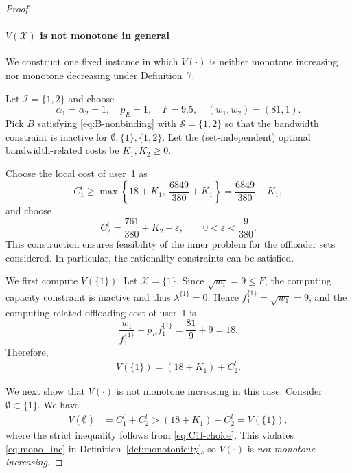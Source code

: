 \documentclass[lettersize,journal]{IEEEtran}
\begin{document}
\begin{proof}
\paragraph{$V(\mathcal{X})$ is not monotone in general}
We construct one fixed instance in which $V(\cdot)$ is neither monotone increasing nor monotone decreasing under Definition~7.

Let $\mathcal{I}=\{1,2\}$ and choose
\[
\alpha_1=\alpha_2=1,\quad p_E=1,\quad F=9.5,\quad (w_1,w_2)=(81,1).
\]
Pick $B$ satisfying \eqref{eq:B-nonbinding} with $\mathcal{S}=\{1,2\}$ so that the bandwidth constraint is inactive for $\emptyset,\{1\},\{1,2\}$.
Let the (set-independent) optimal bandwidth-related costs be $K_1,K_2\ge 0$.

Choose the local cost of user~1 as
\begin{equation}
C_1^l \ge \max\left\{18+K_1,\ \frac{6849}{380}+K_1\right\}
=\frac{6849}{380}+K_1,
\label{eq:C1l-choice}
\end{equation}
and choose
\begin{equation}
C_2^{l}=\frac{761}{380}+K_2+\varepsilon,
\qquad 0<\varepsilon<\frac{9}{380}.
\label{eq:C2l-choice}
\end{equation}
This construction ensures feasibility of the inner problem for the offloader sets considered. In particular, the rationality constraints can be satisfied.

We first compute $V(\{1\})$.
Let $\mathcal{X}=\{1\}$. Since $\sqrt{w_1}=9\le F$, the computing capacity constraint is inactive and thus $\lambda^{\{1\}}=0$.
Hence $f^{\{1\}}_1=\sqrt{w_1}=9$, and the computing-related offloading cost of user~1 is
\[
\frac{w_1}{f^{\{1\}}_1}+p_E f^{\{1\}}_1=\frac{81}{9}+9=18.
\]
Therefore,
\begin{align}
V(\{1\})=(18+K_1)+C_2^{l}.
\label{eq:V-singleton1}
\end{align}

We next show that $V(\cdot)$ is not monotone increasing in this case.
Consider $\emptyset \subset \{1\}$. We have
\begin{align}
V(\emptyset)
&=C_1^{l}+C_2^{l}
>(18+K_1)+C_2^{l}
=V(\{1\}),
\label{eq:not-mono-inc}
\end{align}
where the strict inequality follows from \eqref{eq:C1l-choice}. This violates \eqref{eq:mono_inc} in Definition~\ref{def:monotonicity}, so $V(\cdot)$ is \emph{not monotone increasing}.


\end{proof}
\end{document}
